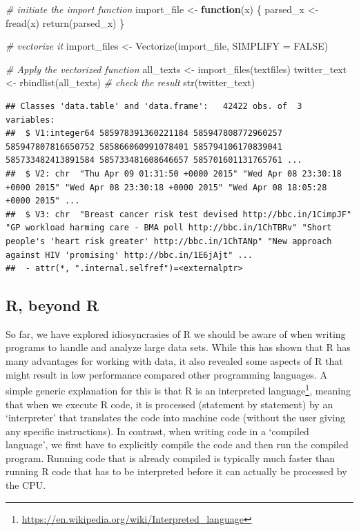 \documentclass[
  12pt,
]{style/krantz}
\newenvironment{Shaded}{\begin{snugshade}}{\end{snugshade}}
\newcommand{\AttributeTok}[1]{\textcolor[rgb]{0.77,0.63,0.00}{#1}}
\newcommand{\CommentTok}[1]{\textcolor[rgb]{0.56,0.35,0.01}{\textit{#1}}}
\newcommand{\ConstantTok}[1]{\textcolor[rgb]{0.00,0.00,0.00}{#1}}
\newcommand{\ControlFlowTok}[1]{\textcolor[rgb]{0.13,0.29,0.53}{\textbf{#1}}}
\newcommand{\FunctionTok}[1]{\textcolor[rgb]{0.00,0.00,0.00}{#1}}
\newcommand{\NormalTok}[1]{#1}
\newcommand{\OtherTok}[1]{\textcolor[rgb]{0.56,0.35,0.01}{#1}}
\renewcommand{\href}[2]{#2\footnote{\url{#1}}}
\begin{document}
\begin{Shaded}
\begin{Highlighting}[]
\CommentTok{\# initiate the import function}
\NormalTok{import\_file }\OtherTok{\textless{}{-}} 
     \ControlFlowTok{function}\NormalTok{(x) \{}
\NormalTok{          parsed\_x }\OtherTok{\textless{}{-}} \FunctionTok{fread}\NormalTok{(x)}
          \FunctionTok{return}\NormalTok{(parsed\_x)}
\NormalTok{     \}}

\CommentTok{\# \textquotesingle{}vectorize\textquotesingle{} it}
\NormalTok{import\_files }\OtherTok{\textless{}{-}} \FunctionTok{Vectorize}\NormalTok{(import\_file, }\AttributeTok{SIMPLIFY =} \ConstantTok{FALSE}\NormalTok{)}

\CommentTok{\# Apply the vectorized function}
\NormalTok{all\_texts }\OtherTok{\textless{}{-}} \FunctionTok{import\_files}\NormalTok{(textfiles)}
\NormalTok{twitter\_text }\OtherTok{\textless{}{-}} \FunctionTok{rbindlist}\NormalTok{(all\_texts)}
\CommentTok{\# check the result}
\FunctionTok{str}\NormalTok{(twitter\_text)}
\end{Highlighting}
\end{Shaded}

\begin{verbatim}
## Classes 'data.table' and 'data.frame':   42422 obs. of  3 variables:
##  $ V1:integer64 585978391360221184 585947808772960257 585947807816650752 585866060991078401 585794106170839041 585733482413891584 585733481608646657 585701601131765761 ... 
##  $ V2: chr  "Thu Apr 09 01:31:50 +0000 2015" "Wed Apr 08 23:30:18 +0000 2015" "Wed Apr 08 23:30:18 +0000 2015" "Wed Apr 08 18:05:28 +0000 2015" ...
##  $ V3: chr  "Breast cancer risk test devised http://bbc.in/1CimpJF" "GP workload harming care - BMA poll http://bbc.in/1ChTBRv" "Short people's 'heart risk greater' http://bbc.in/1ChTANp" "New approach against HIV 'promising' http://bbc.in/1E6jAjt" ...
##  - attr(*, ".internal.selfref")=<externalptr>
\end{verbatim}

\hypertarget{r-beyond-r}{%
\subsection{R, beyond R}\label{r-beyond-r}}

So far, we have explored idiosyncrasies of R we should be aware of when writing programs to handle and analyze large data sets. While this has shown that R has many advantages for working with data, it also revealed some aspects of R that might result in low performance compared other programming languages. A simple generic explanation for this is that R is an \href{https://en.wikipedia.org/wiki/Interpreted_language}{interpreted language}, meaning that when we execute R code, it is processed (statement by statement) by an `interpreter' that translates the code into machine code (without the user giving any specific instructions). In contrast, when writing code in a `compiled language', we first have to explicitly compile the code and then run the compiled program. Running code that is already compiled is typically much faster than running R code that has to be interpreted before it can actually be processed by the CPU.
\end{document}
